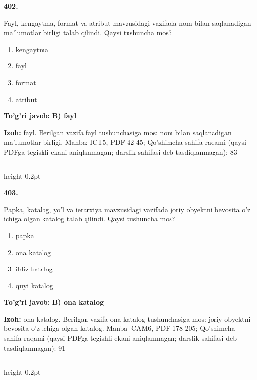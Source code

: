 \documentclass[10pt,a4paper]{article}
\begin{document}
{\bfseries\sffamily\color{ink} 402.}
\par
Fayl, kengaytma, format va atribut mavzusidagi vazifada nom bilan saqlanadigan ma'lumotlar birligi talab qilindi. Qaysi tushuncha mos?
\begin{enumerate}[label=\Alph*),leftmargin=9mm]
\item kengaytma
\item fayl
\item format
\item atribut
\end{enumerate}
\begin{tcolorbox}[enhanced,breakable,colback=teal!4,colframe=teal!60!black,boxrule=0.45pt,arc=1.2mm,left=2.7mm,right=2.7mm,top=1.8mm,bottom=1.8mm,before skip=2mm,after skip=2mm]
{\bfseries\sffamily\color{teal}To'g'ri javob:} \textbf{B) fayl}
\par\smallskip
{\bfseries Izoh:} fayl. Berilgan vazifa fayl tushunchasiga mos: nom bilan saqlanadigan ma'lumotlar birligi. Manba: ICT5, PDF 42-45; Qo'shimcha sahifa raqami (qaysi PDFga tegishli ekani aniqlanmagan; darslik sahifasi deb tasdiqlanmagan): 83
\end{tcolorbox}
\vspace{2mm}\hrule height 0.2pt\vspace{3mm}

{\bfseries\sffamily\color{ink} 403.}
\par
Papka, katalog, yo'l va ierarxiya mavzusidagi vazifada joriy obyektni bevosita o'z ichiga olgan katalog talab qilindi. Qaysi tushuncha mos?
\begin{enumerate}[label=\Alph*),leftmargin=9mm]
\item papka
\item ona katalog
\item ildiz katalog
\item quyi katalog
\end{enumerate}
\begin{tcolorbox}[enhanced,breakable,colback=teal!4,colframe=teal!60!black,boxrule=0.45pt,arc=1.2mm,left=2.7mm,right=2.7mm,top=1.8mm,bottom=1.8mm,before skip=2mm,after skip=2mm]
{\bfseries\sffamily\color{teal}To'g'ri javob:} \textbf{B) ona katalog}
\par\smallskip
{\bfseries Izoh:} ona katalog. Berilgan vazifa ona katalog tushunchasiga mos: joriy obyektni bevosita o'z ichiga olgan katalog. Manba: CAM6, PDF 178-205; Qo'shimcha sahifa raqami (qaysi PDFga tegishli ekani aniqlanmagan; darslik sahifasi deb tasdiqlanmagan): 91
\end{tcolorbox}
\vspace{2mm}\hrule height 0.2pt\vspace{3mm}
\end{document}
